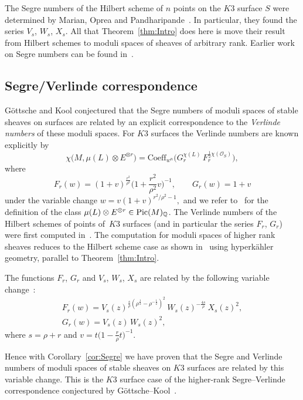 \documentclass[pdftex]{sigma}
\numberwithin{equation}{section}
\newcommand{\BQ}{{\mathbb{Q}}}
\newcommand{\CO}{{\mathcal O}}
\newcommand{\Pic}{\mathop{\rm Pic}\nolimits}
\newcommand{\1}{\mathsf{1}}
\begin{document}
The Segre numbers of the Hilbert scheme of $n$ points on the $K3$ surface $S$
were determined by Marian, Oprea and Pandharipande~\cite{MOP}.
In particular, they found the series $V_s$, $W_s$, $X_s$.
All that Theorem~\ref{thm:Intro} does here is move their result from Hilbert schemes
to moduli spaces of sheaves of arbitrary rank.
Earlier work on Segre numbers can be found in~\cite{EGL, Lehn, MOP1, MOP2, Voisin}.

\subsection{Segre/Verlinde correspondence}
G\"ottsche and Kool conjectured that the Segre numbers of moduli spaces of stable sheaves on surfaces
are related by an explicit correspondence to the {\em Verlinde numbers} of these moduli spaces.
For $K3$ surfaces the Verlinde numbers are known explicitly by
\[
\chi\big(M, \mu(L) \otimes E^{\otimes r}\big) = \mathrm{Coeff}_{w^n}\big( G_{r}^{\chi(L)} \, F_{r}^{\frac{1}{2} \chi(\CO_S)} \big),
\]
where
\begin{equation*}
F_r(w) = (1+v)^{\frac{r^2}{\rho^2}}\bigg(1+\frac{r^2}{\rho^2} v\bigg)^{-1}, \qquad
G_r(w) = 1+v
\end{equation*}
under the variable change $w = v(1+v)^{r^2 / \rho^2-1},$
and we refer to~\cite[equation~(4)]{GK} for the definition of the class $\mu(L) \otimes E^{\otimes r} \in \Pic(M)_{\BQ}$.
The Verlinde numbers of the Hilbert schemes of points of~$K3$ surfaces (and in particular the series $F_r$, $G_r$) were first computed in~\cite{EGL}.
The computation for moduli spaces of higher rank sheaves reduces to the Hilbert scheme case as shown in~\cite{GNY2} using hyperk\"ahler geometry,
parallel to Theorem~\ref{thm:Intro}.

The functions $F_r$, $G_r$ and $V_s$, $W_s$, $X_s$ are related by the following variable change~\cite{GK}:
\begin{gather*}
F_r(w) = V_s(z)^{\frac{s}{\rho} (\rho^{\frac{1}{2}} - \rho^{-\frac{1}{2}})^2} \, W_s(z)^{-\frac{4s}{\rho}} \, X_s(z)^2,
\\
G_r(w) = V_s(z) \, W_s(z)^2,
\end{gather*}
where $s = \rho + r$ and $v = t\big( 1- \tfrac{r}{\rho} t \big)^{-1}$.

Hence with Corollary~\ref{cor:Segre} we have proven that the Segre and Verlinde numbers of moduli spaces of stable sheaves on $K3$ surfaces
are related by this variable change.
This is the $K3$ surface case of the higher-rank Segre--Verlinde correspondence conjectured by G\"ottsche--Kool~\cite[Conjecture~1.7]{GK}.
\end{document}
